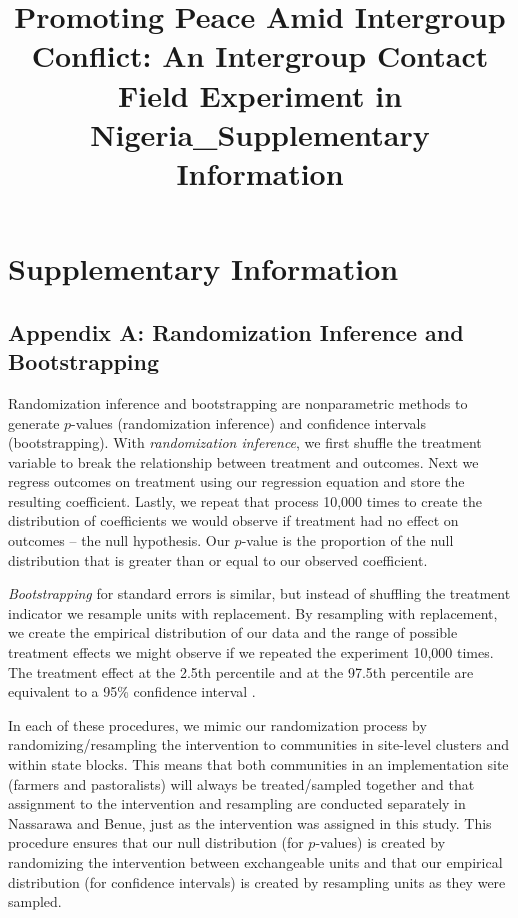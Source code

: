 \documentclass[
]{article}
\title{Promoting Peace Amid Intergroup Conflict: An Intergroup Contact
Field Experiment in Nigeria\_Supplementary Information}
\author{}
\date{\vspace{-2.5em}}
\begin{document}
\maketitle

{
\setcounter{tocdepth}{2}
\tableofcontents
}
\hypertarget{supplementary-information}{%
\section{Supplementary Information}\label{supplementary-information}}

\hypertarget{appendix-a-randomization-inference-and-bootstrapping}{%
\subsection{Appendix A: Randomization Inference and
Bootstrapping}\label{appendix-a-randomization-inference-and-bootstrapping}}

Randomization inference and bootstrapping are nonparametric methods to
generate \(p\)-values (randomization inference) and confidence intervals
(bootstrapping). With \emph{randomization inference}, we first shuffle
the treatment variable to break the relationship between treatment and
outcomes. Next we regress outcomes on treatment using our regression
equation and store the resulting coefficient. Lastly, we repeat that
process 10,000 times to create the distribution of coefficients we would
observe if treatment had no effect on outcomes -- the null hypothesis.
Our \(p\)-value is the proportion of the null distribution that is
greater than or equal to our observed coefficient.

\emph{Bootstrapping} for standard errors is similar, but instead of
shuffling the treatment indicator we resample units with replacement. By
resampling with replacement, we create the empirical distribution of our
data and the range of possible treatment effects we might observe if we
repeated the experiment 10,000 times. The treatment effect at the 2.5th
percentile and at the 97.5th percentile are equivalent to a 95\%
confidence interval .

In each of these procedures, we mimic our randomization process by
randomizing/resampling the intervention to communities in site-level
clusters and within state blocks. This means that both communities in an
implementation site (farmers and pastoralists) will always be
treated/sampled together and that assignment to the intervention and
resampling are conducted separately in Nassarawa and Benue, just as the
intervention was assigned in this study. This procedure ensures that our
null distribution (for \(p\)-values) is created by randomizing the
intervention between exchangeable units and that our empirical
distribution (for confidence intervals) is created by resampling units
as they were sampled.
\end{document}
